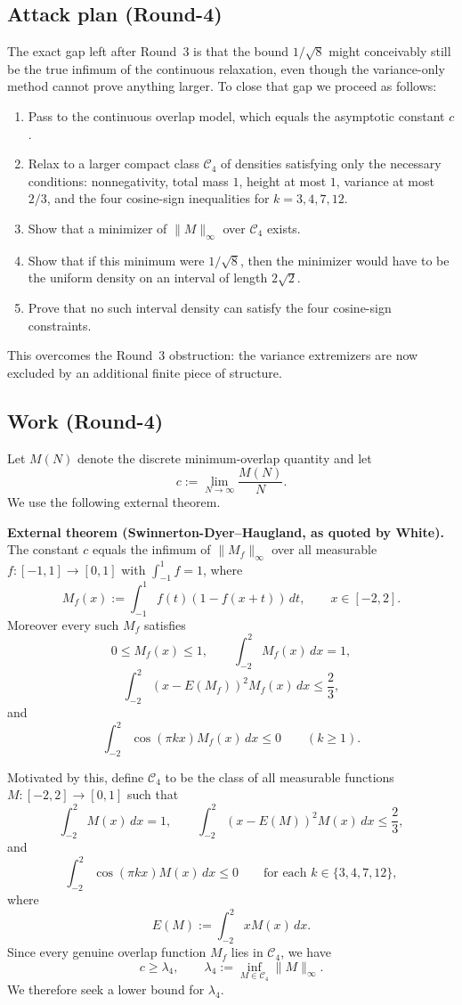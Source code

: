 \subsection{Attack plan (Round-4)}
The exact gap left after Round~3 is that the bound \(1/\sqrt 8\) might conceivably still be the true infimum of the continuous relaxation, even though the variance-only method cannot prove anything larger.
To close that gap we proceed as follows:
\begin{enumerate}
\item Pass to the continuous overlap model, which equals the asymptotic constant \(c\).
\item Relax to a larger compact class \(\mathcal C_4\) of densities satisfying only the necessary conditions:
nonnegativity, total mass \(1\), height at most \(1\), variance at most \(2/3\), and the four cosine-sign inequalities for \(k=3,4,7,12\).
\item Show that a minimizer of \(\|M\|_\infty\) over \(\mathcal C_4\) exists.
\item Show that if this minimum were \(1/\sqrt 8\), then the minimizer would have to be the uniform density on an interval of length \(2\sqrt 2\).
\item Prove that no such interval density can satisfy the four cosine-sign constraints.
\end{enumerate}
This overcomes the Round~3 obstruction: the variance extremizers are now excluded by an additional finite piece of structure.

\subsection{Work (Round-4)}
Let \(M(N)\) denote the discrete minimum-overlap quantity and let
\[
 c:=\lim_{N\to\infty} \frac{M(N)}{N}.
\]
We use the following external theorem.

\medskip
\noindent\textbf{External theorem (Swinnerton-Dyer--Haugland, as quoted by White).}
The constant \(c\) equals the infimum of \(\|M_f\|_\infty\) over all measurable
\(f:[-1,1]\to[0,1]\) with \(\int_{-1}^{1}f=1\), where
\[
 M_f(x):=\int_{-1}^{1} f(t)(1-f(x+t))\,dt,\qquad x\in[-2,2].
\]
Moreover every such \(M_f\) satisfies
\[
 0\le M_f(x)\le 1,\qquad \int_{-2}^{2} M_f(x)\,dx=1,
\]
\[
 \int_{-2}^{2}(x-E(M_f))^2M_f(x)\,dx\le \frac23,
\]
and
\[
 \int_{-2}^{2}\cos(\pi kx)M_f(x)\,dx\le 0\qquad (k\ge 1).
\]

Motivated by this, define \(\mathcal C_4\) to be the class of all measurable functions
\(M:[-2,2]\to[0,1]\) such that
\[
 \int_{-2}^{2} M(x)\,dx=1,
\qquad
 \int_{-2}^{2}(x-E(M))^2M(x)\,dx\le \frac23,
\]
and
\[
 \int_{-2}^{2}\cos(\pi kx)M(x)\,dx\le 0
 \qquad \text{for each }k\in\{3,4,7,12\},
\]
where
\[
 E(M):=\int_{-2}^{2} xM(x)\,dx.
\]
Since every genuine overlap function \(M_f\) lies in \(\mathcal C_4\), we have
\[
 c\ge \lambda_4,
 \qquad
 \lambda_4:=\inf_{M\in\mathcal C_4}\|M\|_\infty.
\]
We therefore seek a lower bound for \(\lambda_4\).

